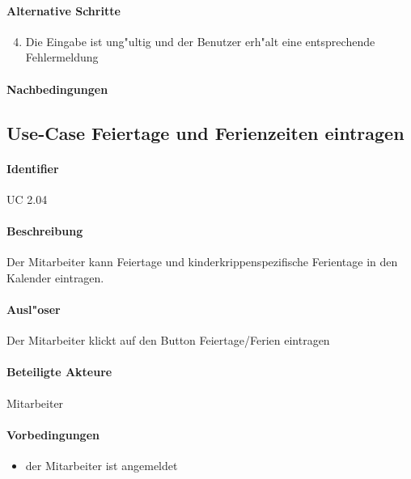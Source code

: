   \paragraph{Alternative Schritte}
  \begin{enumerate}
  \setcounter{enumi}{3}
   \item Die Eingabe ist ung"ultig und der Benutzer erh"alt eine entsprechende Fehlermeldung
  \end{enumerate}

  \paragraph{Nachbedingungen}

  
  \newpage
 \subsection{Use-Case Feiertage und Ferienzeiten eintragen}
  \paragraph{Identifier}
  UC 2.04
  \paragraph{Beschreibung}
  Der Mitarbeiter kann Feiertage und kinderkrippenspezifische Ferientage in den Kalender eintragen.
  \paragraph{Ausl"oser}
  Der Mitarbeiter klickt auf den Button \dq Feiertage/Ferien eintragen\dq
  \paragraph{Beteiligte Akteure}   \leavevmode \newline
    Mitarbeiter
  \paragraph{Vorbedingungen}
  \begin{itemize}
   \item der Mitarbeiter ist angemeldet
  \end{itemize}


